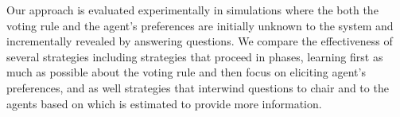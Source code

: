 \documentclass{article}
\begin{document}
Our approach is evaluated experimentally in simulations where the both the voting rule and the agent's preferences are initially unknown to the system and incrementally revealed by answering questions.
We compare the effectiveness of several strategies  including strategies that proceed in phases, learning first as much as possible about the voting rule and then focus on eliciting agent's preferences, and as well strategies that interwind questions to chair and to the agents based on which is estimated to provide more information.



\end{document}
